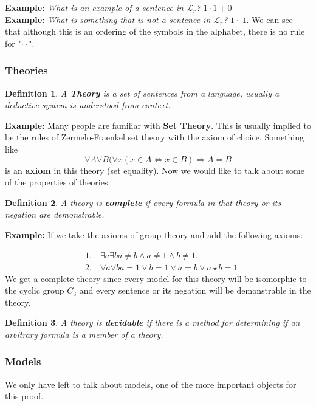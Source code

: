 \documentclass{article}
\newtheorem{defn}{Definition}
\begin{document}
\noindent\textbf{Example:} \textit{What is an example of a sentence in $\mathcal{L}_{r}$?} $1 \cdot 1 + 0$\\[.07in]

\noindent\textbf{Example:} \textit{What is something that is not a sentence in $\mathcal{L}_{r}$?} $1 \cdot \cdot  1$. We can see that although this is an ordering of the symbols in the alphabet, there is no rule for "$\cdot \cdot$".

\subsubsection{Theories}
\begin{defn}
    A \textbf{Theory} is a set of sentences from a language, usually a deductive system is understood from context.
\end{defn}

\noindent\textbf{Example:} Many people are familiar with \textbf{Set Theory}. This is usually implied to be the rules of Zermelo-Fraenkel set theory with the axiom of choice. Something like $$\forall A \forall B(\forall x(x\in A \iff x \in B) \Rightarrow A = B$$ is an \textbf{axiom} in this theory (set equality).
Now we would like to talk about some of the properties of theories.

\begin{defn}
  A theory is \textbf{complete} if every formula in that theory or its negation
  are demonstrable.
\end{defn}

\noindent \textbf{Example:} If we take the axioms of group theory and add the
following axioms:

\begin{align*}
  &1. \quad \exists a  \exists b a\neq b \land a\neq1 \land b\neq1.\\
  &2. \quad \forall a \forall b a=1\lor b=1 \lor a=b \lor a\star b=1
\end{align*}
We get a complete theory since every model for this theory will be isomorphic to
the cyclic group $C_{3}$ and every sentence or its negation will be demonstrable
in the theory.

\begin{defn}
  A theory is \textbf{decidable} if there is a method for determining if an
  arbitrary formula is a member of a theory.
\end{defn}

\subsubsection{Models}
We only have left to talk about models, one of the more important objects for
this proof.
\end{document}
